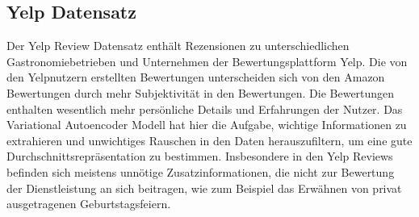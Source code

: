 



\subsection{Yelp Datensatz}
Der Yelp Review Datensatz \citep{meansum} enthält Rezensionen zu unterschiedlichen Gastronomiebetrieben und Unternehmen der Bewertungsplattform Yelp. 
Die von den Yelpnutzern erstellten Bewertungen unterscheiden sich von den Amazon Bewertungen durch mehr Subjektivität in den Bewertungen.
Die Bewertungen enthalten wesentlich mehr persönliche Details und Erfahrungen der Nutzer.
Das Variational Autoencoder Modell hat hier die Aufgabe, wichtige Informationen zu extrahieren und unwichtiges Rauschen in den Daten herauszufiltern, um eine gute Durchschnittsrepräsentation zu bestimmen.
Insbesondere in den Yelp Reviews befinden sich meistens unnötige Zusatzinformationen, die nicht zur Bewertung der Dienstleistung an sich beitragen, wie zum Beispiel das Erwähnen von privat ausgetragenen Geburtstagsfeiern. 

